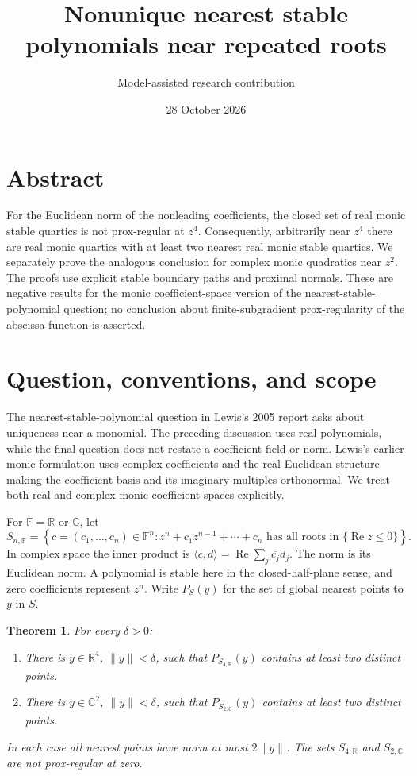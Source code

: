 \documentclass[11pt]{article}
\title{Nonunique nearest stable polynomials near repeated roots}
\author{Model-assisted research contribution}
\date{28 October 2026}
\newtheorem{theorem}{Theorem}
\newcommand{\R}{\mathbb R}
\newcommand{\C}{\mathbb C}
\newcommand{\ip}[2]{\langle #1,#2\rangle}
\newcommand{\norm}[1]{\lVert #1\rVert}
\begin{document}
\maketitle

\section*{Abstract}
For the Euclidean norm of the nonleading coefficients, the closed set of real monic stable quartics is not prox-regular at \(z^4\). Consequently, arbitrarily near \(z^4\) there are real monic quartics with at least two nearest real monic stable quartics. We separately prove the analogous conclusion for complex monic quadratics near \(z^2\). The proofs use explicit stable boundary paths and proximal normals. These are negative results for the monic coefficient-space version of the nearest-stable-polynomial question; no conclusion about finite-subgradient prox-regularity of the abscissa function is asserted.


\section{Question, conventions, and scope}

The nearest-stable-polynomial question in Lewis's 2005 report \cite[p.~106, Question~1]{owr} asks about uniqueness near a monomial. The preceding discussion uses real polynomials, while the final question does not restate a coefficient field or norm. Lewis's earlier monic formulation \cite[Section~8]{lewis} uses complex coefficients and the real Euclidean structure making the coefficient basis and its imaginary multiples orthonormal. We treat both real and complex monic coefficient spaces explicitly.

For \(\mathbb F=\R\) or \(\C\), let
\[
 S_{n,\mathbb F}
 =\left\{c=(c_1,\ldots,c_n)\in\mathbb F^n:
       z^n+c_1z^{n-1}+\cdots+c_n
       \text{ has all roots in }\{\operatorname{Re}z\leq0\}\right\}.
\]
In complex space the inner product is
\(\ip{c}{d}=\operatorname{Re}\sum_j\overline{c_j}d_j\).
The norm is its Euclidean norm. A polynomial is stable here in the closed-half-plane sense, and zero coefficients represent \(z^n\). Write \(P_S(y)\) for the set of global nearest points to \(y\) in \(S\).

\begin{theorem}\label{thm:main}
For every \(\delta>0\):
\begin{enumerate}
\item There is \(y\in\R^4\), \(\norm{y}<\delta\), such that
      \(P_{S_{4,\R}}(y)\) contains at least two distinct points.
\item There is \(y\in\C^2\), \(\norm{y}<\delta\), such that
      \(P_{S_{2,\C}}(y)\) contains at least two distinct points.
\end{enumerate}
In each case all nearest points have norm at most \(2\norm{y}\).
The sets \(S_{4,\R}\) and \(S_{2,\C}\) are not prox-regular at zero.
\end{theorem}
\end{document}
